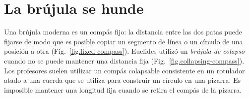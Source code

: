 
\chapter{La brújula se hunde}\label{c.collapse}


Una brújula moderna es un compás fijo: la distancia entre las dos patas puede fijarse de modo que es posible copiar un segmento de línea o un círculo de una posición a otra (Fig.~\ref{fig.fixed-compass}). Euclides utilizó un \emph{brújula de colapso} cuando no se puede mantener una distancia fija (Fig.~\ref{fig.collapsing-compass}). Los profesores suelen utilizar un compás colapsable consistente en un rotulador atado a una cuerda que se utiliza para construir un círculo en una pizarra. Es imposible mantener una longitud fija cuando se retira el compás de la pizarra. 

